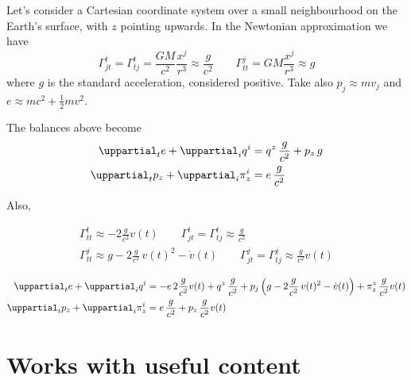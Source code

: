 \documentclass[\ifafour a4paper,12pt,\else a5paper,10pt,\fi%
onecolumn,oneside,article,%
british%
]{memoir}
\theoremstyle{remark}
\theoremstyle{innote}
\newcommand*{\de}{\uppartial}%
\renewcommand*{\|}[1][]{\nonscript\:#1\vert\nonscript\:\mathopen{}}
\newcommand*{\sect}{\S}%
\begin{document}
Let's consider a Cartesian coordinate system over a small neighbourhood on the Earth's surface, with $z$ pointing upwards. In the Newtonian approximation we have \autocites[\sect\,5.2.3]{poissonetal2014}
\begin{equation}
  \label{eq:christof_newt}
  \varGamma^{t}_{jt}=\varGamma^{t}_{tj} =
    \frac{GM}{c^{2}}\frac{x^{j}}{r^{3}} \approx \frac{g}{c^{2}}
  \qquad\varGamma^{j}_{tt} = GM\frac{x^{j}}{r^{3}} \approx g
\end{equation}
where $g$ is the standard acceleration, considered positive. Take also $p_{j} \approx m v_{j}$ and $e\approx m c^{2} + \frac{1}{2}mv^{2}$.



The balances above become
\begin{align}
  \label{eq:div_e_appr}
  \de_{t}e + \de_{i}q^{i} &=
  q^{z}\, \frac{g}{c^{2}}
  +p_{z}\, g
  \\
  \label{eq:div_p_appr}
  \de_{t}p_{z} +  \de_{i}\pi^{i}_{z} &=
  e\,\frac{g}{c^{2}}
\end{align}

Also,

\begin{equation}
  \label{eq:christof_body}
  \begin{gathered}
    \varGamma^{t}_{tt} \approx
    -2\frac{g}{c^{2}} v(t)
    \qquad
    \varGamma^{t}_{jt}=\varGamma^{t}_{tj}
    \approx \frac{g}{c^{2}}
    \\
    \varGamma^{j}_{tt} \approx
    g - 2\frac{g}{c^{2}}\,v(t)^{2} - \dot{v}(t)
    \qquad
    \varGamma^{j}_{jt} = \varGamma^{j}_{tj} \approx
    \frac{g}{c^{2}} v(t)
  \end{gathered}
\end{equation}

\begin{align}
  \label{eq:div_e}
  \de_{t}e + \de_{i}q^{i} &=
  -e\,2\frac{g}{c^{2}} v(t)
  +q^{z}\, \frac{g}{c^{2}}
  +p_{j}\, \Bigl(g - 2\frac{g}{c^{2}}\,v(t)^{2} - \dot{v}(t)\Bigr)
  +\pi^{z}_{z}\, \frac{g}{c^{2}} v(t)
  \\
  \label{eq:div_p}
  \de_{t}p_{z} +  \de_{i}\pi^{i}_{z} &=
  e\, \frac{g}{c^{2}}
  +p_{z}\,\frac{g}{c^{2}} v(t)
\end{align}


\section{Works with useful content}
\label{sec:works}
\end{document}

